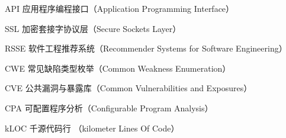 \begin{denotation}[3cm]
\item[API] 应用程序编程接口（Application Programming Interface）
\item[SSL] 加密套接字协议层（Secure Sockets Layer）
\item[RSSE] 软件工程推荐系统（Recommender Systems for Software Engineering）
\item[CWE] 常见缺陷类型枚举（Common Weakness Enumeration）
\item[CVE] 公共漏洞与暴露库（Common Vulnerabilities and Exposures）
\item[CPA] 可配置程序分析（Configurable Program Analysis）
\item[kLOC] 千源代码行 （kilometer Lines Of Code）
\end{denotation}
